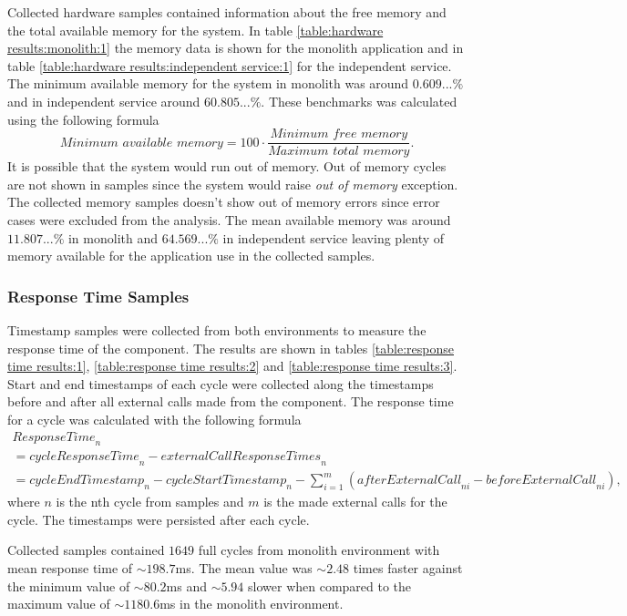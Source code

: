Collected hardware samples contained information about the free memory and the total available memory for the system.
In table \ref{table:hardware results:monolith:1} the memory data is shown for the monolith application and in table \ref{table:hardware results:independent service:1} for the independent service.
The minimum available memory for the system in monolith was around $0.609...\%$ and in independent service around $60.805...\%$.
These benchmarks was calculated using the following formula
\[
\textit{Minimum available memory} = 100 \cdot \frac{\textit{Minimum free memory}}{\textit{Maximum total memory}}
.\]
It is possible that the system would run out of memory.
Out of memory cycles are not shown in samples since the system would raise \textit{out of memory} exception.
The collected memory samples doesn't show out of memory errors since error cases were excluded from the analysis.
The mean available memory was around $11.807...\%$ in monolith and $64.569...\%$ in independent service leaving plenty of memory available for the application use in the collected samples.

\subsubsection{Response Time Samples}
Timestamp samples were collected from both environments to measure the response time of the component.
The results are shown in tables \ref{table:response time results:1}, \ref{table:response time results:2} and \ref{table:response time results:3}.
Start and end timestamps of each cycle were collected along the timestamps before and after all external calls made from the component.
The response time for a cycle was calculated with the following formula
\begin{gather*}
\textit{ResponseTime}_n
\\ =\textit{cycleResponseTime}_n - \textit{externalCallResponseTimes}_n
\\ = \textit{cycleEndTimestamp}_n - \textit{cycleStartTimestamp}_n - 
    \sum_{i=1}^{\textit{m}} (\textit{afterExternalCall}_{ni} -     \textit{beforeExternalCall}_{ni}),
\end{gather*}
where $n$ is the nth cycle from samples and $m$ is the made external calls for the cycle.
The timestamps were persisted after each cycle.

Collected samples contained $1649$ full cycles from monolith environment with mean response time of $\sim198.7$ms.
The mean value was $\sim2.48$ times faster against the minimum value of $\sim 80.2$ms and $\sim5.94$ slower when compared to the maximum value of $\sim1180.6$ms in the monolith environment.

